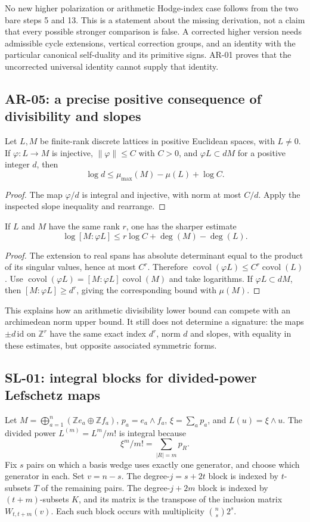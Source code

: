 No new higher polarization or arithmetic Hodge-index case follows from the
two bare steps 5 and 13.  This is a statement about the missing derivation,
not a claim that every possible stronger comparison is false.  A corrected
higher version needs admissible cycle extensions, vertical correction
groups, and an identity with the particular canonical self-duality and its
primitive signs.  AR-01 proves that the uncorrected universal identity
cannot supply that identity.

\subsection{AR-05: a precise positive consequence of divisibility and slopes}
\label{ar:divisibility-slope}

Let $L,M$ be finite-rank discrete lattices in positive Euclidean spaces,
with $L\ne0$.  If $\varphi:L\to M$ is injective, $\|\varphi\|\le C$
with $C>0$, and
$\varphi L\subset dM$ for a positive integer $d$, then
\[
 \log d\le\mu_{\max}(M)-\mu(L)+\log C.
\]
\begin{proof}
The map $\varphi/d$ is integral and injective, with norm at most $C/d$.
Apply the inspected slope inequality and rearrange.
\end{proof}
If $L$ and $M$ have the same rank $r$, one has the sharper estimate
\[
 \log[M:\varphi L]\le r\log C+\deg(M)-\deg(L).
\]
\begin{proof}
The extension to real spans has absolute determinant equal to the product
of its singular values, hence at most $C^r$.  Therefore
$\operatorname{covol}(\varphi L)\le C^r\operatorname{covol}(L)$.
Use $\operatorname{covol}(\varphi L)=[M:\varphi L]\operatorname{covol}(M)$
and take logarithms.  If $\varphi L\subset dM$, then
$[M:\varphi L]\ge d^r$, giving the corresponding bound with $\mu(M)$.
\end{proof}
This explains how an arithmetic divisibility lower bound can compete with
an archimedean norm upper bound.  It still does not determine a signature:
the maps $\pm d\,\mathrm{id}$ on $\mathbb Z^r$ have the same exact
index $d^r$, norm $d$ and slopes, with equality in these estimates, but
opposite associated symmetric forms.

\subsection{SL-01: integral blocks for divided-power Lefschetz maps}
\label{sl:blocks}

Let $M=\bigoplus_{a=1}^n(\mathbb Ze_a\oplus\mathbb Zf_a)$,
$p_a=e_a\wedge f_a$, $\xi=\sum_a p_a$, and $L(u)=\xi\wedge u$.
The divided power $L^{(m)}=L^m/m!$ is integral because
\[
 \xi^m/m!=\sum_{|R|=m}p_R.
\]
Fix $s$ pairs on which a basis wedge uses exactly one generator, and choose
which generator in each.  Set $v=n-s$.  The degree-$j=s+2t$ block is
indexed by $t$-subsets $T$ of the remaining pairs.  The degree-$j+2m$ block
is indexed by $(t+m)$-subsets $K$, and its matrix is the transpose of the
inclusion matrix $W_{t,t+m}(v)$.  Each such block occurs with multiplicity
$\binom ns2^s$.

